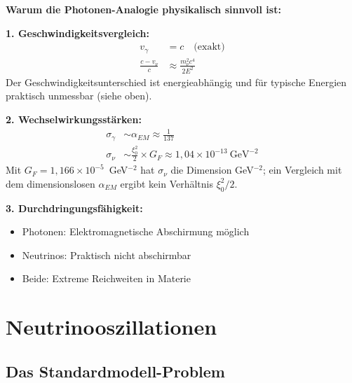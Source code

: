 	\begin{photon}
		\textbf{Warum die Photonen-Analogie physikalisch sinnvoll ist:}
		
		\textbf{1. Geschwindigkeitsvergleich:}
		\begin{align}
			v_\gamma &= c \quad \text{(exakt)} \\
			\frac{c - v_\nu}{c} &\approx \frac{m_\nu^2 c^4}{2E^2}
		\end{align}
		Der Geschwindigkeitsunterschied ist energieabhängig und für typische Energien praktisch unmessbar (siehe oben).
		
		\textbf{2. Wechselwirkungsstärken:}
		\begin{align}
			\sigma_\gamma &\sim \alpha_{EM} \approx \frac{1}{137} \\
			\sigma_\nu &\sim \frac{\xi_0^2}{2} \times G_F \approx 1,04 \times 10^{-13}\ \text{GeV}^{-2}
		\end{align}
		Mit $G_F = 1{,}166 \times 10^{-5}$~GeV$^{-2}$ hat $\sigma_\nu$ die Dimension GeV$^{-2}$; ein Vergleich mit dem dimensionslosen $\alpha_{EM}$ ergibt kein Verhältnis $\xi_0^2/2$.
		
		\textbf{3. Durchdringungsfähigkeit:}
		\begin{itemize}
			\item Photonen: Elektromagnetische Abschirmung möglich
			\item Neutrinos: Praktisch nicht abschirmbar
			\item Beide: Extreme Reichweiten in Materie
		\end{itemize}
	\end{photon}
	
	\section{Neutrinooszillationen}
	
	\subsection{Das Standardmodell-Problem}
	
